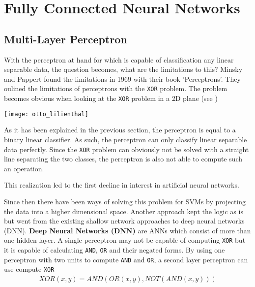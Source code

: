 

\section[Fully Connected NNs]{Fully Connected Neural Networks}
\subsection{Multi-Layer Perceptron}
With the perceptron at hand for which is capable of classification any linear separable data, the question becomes, what are the limitations to this?
Minsky and Pappert found the limitations in 1969 with their book 'Perceptrons'.
They oulined the limitations of perceptrons with the \lstinline|XOR| problem.
The problem becomes obvious when looking at the \lstinline|XOR| problem in a 2D plane (see )
\begin{marginfigure}
    \texttt{[image: otto\_lilienthal]}
    \caption[]{\lstinline|OR| and \lstinline|XOR| operations visualized. The \lstinline|XOR| problem cannot be solved by drawing a single line.}
\end{marginfigure}

As it has been explained in the previous section, the perceptron is equal to a binary linear classifier.
As such, the perceptron can only classify linear separable data perfectly.
Since the \lstinline|XOR| problem can obviously not be solved with a straight line separating the two classes, the perceptron is also not able to compute such an operation. 

This realization led to the first decline in interest in artificial neural networks.

Since then there have been ways of solving this problem for SVMs by projecting the data into a higher dimensional space.
Another approach kept the logic as is but went from the existing shallow network approaches to deep neural networks (DNN).
\textbf{Deep Neural Networks (DNN)} are ANNs which consist of more than one hidden layer.
A single perceptron may not be capable of computing \lstinline|XOR| but it is capable of calculating \lstinline|AND|, \lstinline|OR| and their negated forms.
By using one perceptron with two units to compute \lstinline|AND| and \lstinline|OR|, a second layer perceptron can use compute \lstinline|XOR|
\begin{align}
    XOR(x, y) = AND(OR(x, y), NOT(AND(x, y)))
\end{align}

